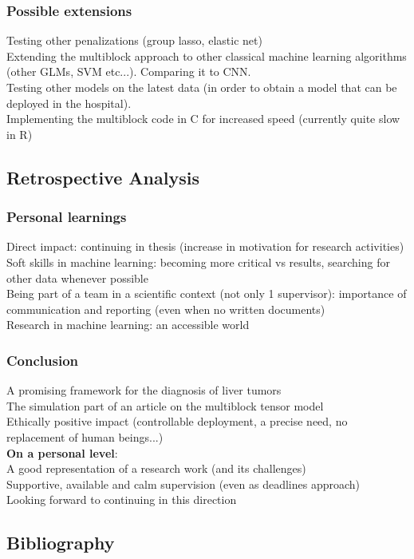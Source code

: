 \documentclass{beamer}
\begin{document}
\begin{frame}
    \frametitle{Possible extensions}
    Testing other penalizations (group lasso, elastic net)\\[10 pt]
    Extending the multiblock approach to other classical machine learning algorithms (other GLMs, SVM etc...). Comparing it to CNN.\\[10 pt]
    Testing other models on the latest data (in order to obtain a model that can be deployed in the hospital).\\[10 pt]
    Implementing the multiblock code in C for increased speed (currently quite slow in R)
\end{frame}

\begin{frame}
    \section{Retrospective Analysis}
\end{frame}

\begin{frame}
    \frametitle{Personal learnings}
    Direct impact: continuing in thesis (increase in motivation for research activities)\\[10 pt]
    Soft skills in machine learning: becoming more critical vs results, searching for other data whenever possible\\[10 pt]
    Being part of a team in a scientific context (not only 1 supervisor): importance of communication and reporting (even when no written documents)\\[10 pt]
    Research in machine learning: an accessible world
\end{frame}


\begin{frame}
    \frametitle{Conclusion}
    A promising framework for the diagnosis of liver tumors\\[10 pt]
    The simulation part of an article on the multiblock tensor model\\[10 pt]
    Ethically positive impact (controllable deployment, a precise need, no replacement of human beings...)\\[20 pt]
    \textbf{On a personal level}:\\[5 pt]
    A good representation of a research work (and its challenges)\\[10 pt]
    Supportive, available and calm supervision (even as deadlines approach)\\[10 pt]
    Looking forward to continuing in this direction
\end{frame}

\begin{frame}
\section*{Bibliography}
\end{frame}


\begin{frame}[allowframebreaks] 
    
     
    \end{frame}
\end{document}
